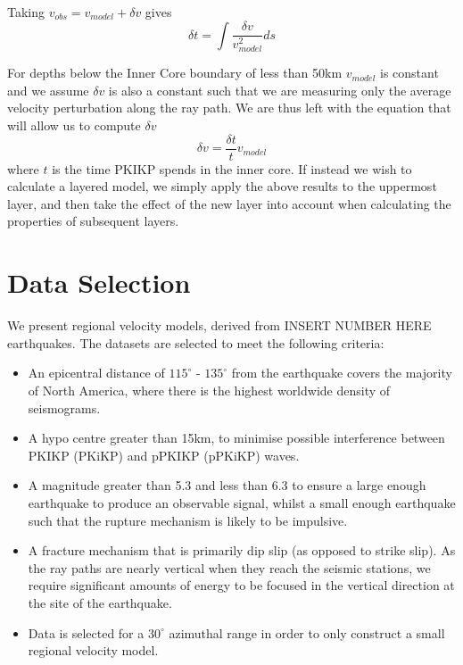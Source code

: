 \documentclass[11pt,a4paper]{article}
\begin{document}
Taking $v_{obs} = v_{model} + \delta v$ gives
\begin{equation}
	\delta t = \int \frac{\delta v}{v^{2}_{model}} ds
\end{equation}

For depths below the Inner Core boundary of less than 50km $v_{model}$ is constant and we assume $\delta v$ is also a constant such that we are measuring only the average velocity perturbation along the ray path. We are thus left with the equation that will allow us to compute $\delta v$
\begin{equation}
	\delta v = \frac{\delta t}{t} v_{model}
\end{equation}
where $t$ is the time PKIKP spends in the inner core. If instead we wish to calculate a layered model, we simply apply the above results to the uppermost layer, and then take the effect of the new layer into account when calculating the properties of subsequent layers.

\section{Data Selection}
\label{sec:Data}
We present regional velocity models, derived from INSERT NUMBER HERE earthquakes. The datasets are selected to meet the following criteria:

\begin{itemize}
	\item An epicentral distance of $115^{\circ}$ - $135^{\circ}$ from the earthquake covers the majority of North America, where there is the highest worldwide density of seismograms.
	\item A hypo centre greater than 15km, to minimise possible interference between PKIKP (PKiKP) and pPKIKP (pPKiKP) waves.
	\item A magnitude greater than 5.3 and less than 6.3 to ensure a large enough earthquake to produce an observable signal, whilst a small enough earthquake such that the rupture mechanism is likely to be impulsive.
	\item A fracture mechanism that is primarily dip slip (as opposed to strike slip). As the ray paths are nearly vertical when they reach the seismic stations, we require significant amounts of energy to be focused in the vertical direction at the site of the earthquake.
	\item Data is selected for a $30^{\circ}$ azimuthal range in order to only construct a small regional velocity model.
\end{itemize}
\end{document}
